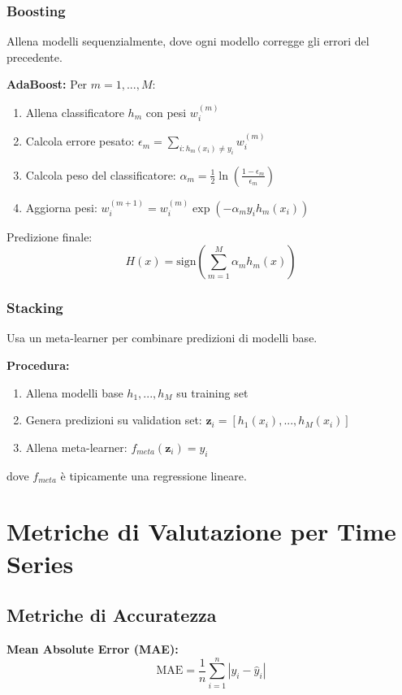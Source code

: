 \documentclass[12pt,a4paper,twoside]{report}
\begin{document}
\subsubsection{Boosting}
Allena modelli sequenzialmente, dove ogni modello corregge gli errori del precedente.

\textbf{AdaBoost:}
Per $m = 1, ..., M$:
\begin{enumerate}
    \item Allena classificatore $h_m$ con pesi $w_i^{(m)}$
    \item Calcola errore pesato: $\epsilon_m = \sum_{i: h_m(x_i) \neq y_i} w_i^{(m)}$
    \item Calcola peso del classificatore: $\alpha_m = \frac{1}{2} \ln\left(\frac{1-\epsilon_m}{\epsilon_m}\right)$
    \item Aggiorna pesi: $w_i^{(m+1)} = w_i^{(m)} \exp(-\alpha_m y_i h_m(x_i))$
\end{enumerate}

Predizione finale:
$$H(x) = \text{sign}\left(\sum_{m=1}^{M} \alpha_m h_m(x)\right)$$

\subsubsection{Stacking}
Usa un meta-learner per combinare predizioni di modelli base.

\textbf{Procedura:}
\begin{enumerate}
    \item Allena modelli base $h_1, ..., h_M$ su training set
    \item Genera predizioni su validation set: $\mathbf{z}_i = [h_1(x_i), ..., h_M(x_i)]$
    \item Allena meta-learner: $f_{meta}(\mathbf{z}_i) = y_i$
\end{enumerate}

dove $f_{meta}$ è tipicamente una regressione lineare.

\section{Metriche di Valutazione per Time Series}

\subsection{Metriche di Accuratezza}

\textbf{Mean Absolute Error (MAE):}
$$\text{MAE} = \frac{1}{n} \sum_{i=1}^{n} |y_i - \hat{y}_i|$$
\end{document}
